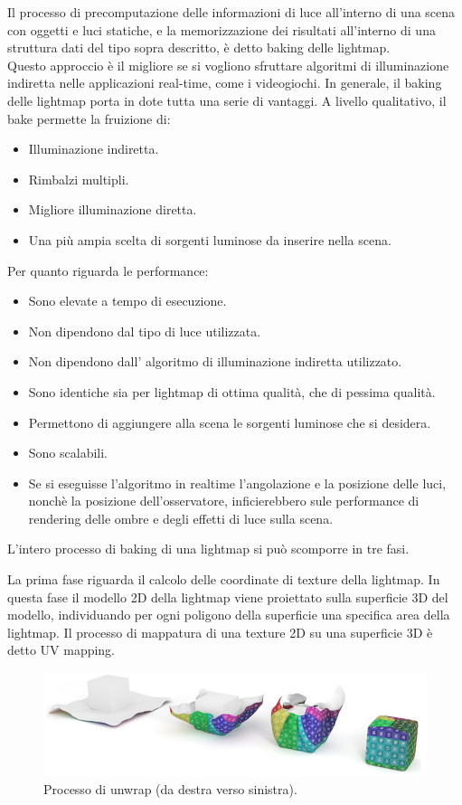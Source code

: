 Il processo di precomputazione delle informazioni di luce all’interno di una scena con oggetti e luci statiche, e la memorizzazione dei risultati all’interno di una struttura dati del tipo sopra descritto, è detto baking delle lightmap. 
\\
Questo approccio è il migliore se si vogliono sfruttare algoritmi di illuminazione indiretta nelle applicazioni real-time, come i videogiochi. In generale, il baking delle lightmap porta in dote tutta una serie di vantaggi.
A livello qualitativo, il bake permette la fruizione di:
\begin{itemize}
\item Illuminazione indiretta.
\item Rimbalzi multipli.
\item Migliore illuminazione diretta.
\item Una più ampia scelta di sorgenti luminose da inserire nella scena.
\end{itemize}
Per quanto riguarda le performance:
\begin{itemize}
\item Sono elevate a tempo di esecuzione.
\item Non dipendono dal tipo di luce utilizzata.
\item Non dipendono dall’ algoritmo di illuminazione indiretta utilizzato.
\item Sono identiche sia per lightmap di ottima qualità, che di pessima qualità.
\item Permettono di aggiungere alla scena le sorgenti luminose che si desidera.
\item Sono scalabili.
\item Se si eseguisse l’algoritmo in realtime l’angolazione e la posizione delle luci, nonchè la posizione dell’osservatore, inficierebbero sule performance di rendering delle ombre e degli effetti di luce sulla scena.
\end{itemize}
L’intero processo di baking di una lightmap si può scomporre in tre fasi.

La prima fase riguarda il calcolo delle coordinate di texture della lightmap.
In questa fase il modello 2D della lightmap viene proiettato sulla superficie 3D del modello, individuando per ogni poligono della superficie una specifica area della lightmap.
Il processo di mappatura di una texture 2D su una superficie 3D è detto UV mapping.
\\
\begin{figure}[htb]
 \centering
 \includegraphics[width=0.8\linewidth]{images/chapter_stato_arte/stato_arte_unwrap.png}\hfill
 \caption[Mappatura delle coordinate UV]{Processo di unwrap (da destra verso sinistra).}
 \label{fig:stato_arte_unwrap}
\end{figure}

